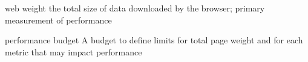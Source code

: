 web weight 
  the total size of data downloaded by the browser; primary measurement of performance 

performance budget 
  A budget to define limits for total page weight and for each metric that may impact performance 

